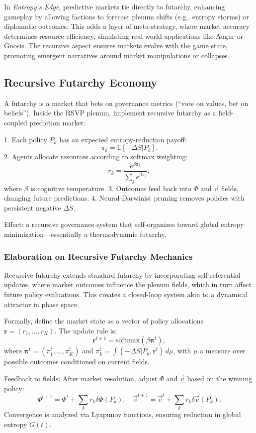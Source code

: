 \documentclass[12pt]{article}
\theoremstyle{definition}
\begin{document}
In \emph{Entropy’s Edge}, predictive markets tie directly to futarchy, enhancing gameplay by allowing factions to forecast plenum shifts (e.g., entropy storms) or diplomatic outcomes. This adds a layer of meta-strategy, where market accuracy determines resource efficiency, simulating real-world applications like Augur or Gnosis. The recursive aspect ensures markets evolve with the game state, promoting emergent narratives around market manipulations or collapses.

\subsection{Recursive Futarchy Economy}
A futarchy is a market that bets on governance metrics (“vote on values, bet on beliefs”). Inside the RSVP plenum, implement recursive futarchy as a field-coupled prediction market:

1. Each policy $P_k$ has an expected entropy-reduction payoff:
   \[
   \pi_k = \mathbb{E}[-\Delta S | P_k].
   \]
2. Agents allocate resources according to softmax weighting:
   \[
   r_k = \frac{e^{\beta \pi_k}}{\sum_j e^{\beta \pi_j}},
   \]
   where $\beta$ is cognitive temperature.
3. Outcomes feed back into $\Phi$ and $\vec{v}$ fields, changing future predictions.
4. Neural-Darwinist pruning removes policies with persistent negative $\Delta S$.

Effect: a recursive governance system that self-organizes toward global entropy minimization—essentially a thermodynamic futarchy.

\subsubsection{Elaboration on Recursive Futarchy Mechanics}
Recursive futarchy extends standard futarchy by incorporating self-referential updates, where market outcomes influence the plenum fields, which in turn affect future policy evaluations. This creates a closed-loop system akin to a dynamical attractor in phase space.

Formally, define the market state as a vector of policy allocations $\mathbf{r} = (r_1, \dots, r_K)$. The update rule is:
\[
\mathbf{r}^{t+1} = \text{softmax}(\beta \boldsymbol{\pi}^{t}),
\]
where $\boldsymbol{\pi}^t = (\pi_1^t, \dots, \pi_K^t)$ and $\pi_k^t = \int (-\Delta S | P_k, \mathbf{r}^t) \, d\mu$, with $\mu$ a measure over possible outcomes conditioned on current fields.

Feedback to fields: After market resolution, adjust $\Phi$ and $\vec{v}$ based on the winning policy:
\[
\Phi^{t+1} = \Phi^t + \sum_k r_k \delta \Phi(P_k), \quad \vec{v}^{t+1} = \vec{v}^t + \sum_k r_k \delta \vec{v}(P_k).
\]
Convergence is analyzed via Lyapunov functions, ensuring reduction in global entropy $G(t)$.
\end{document}

